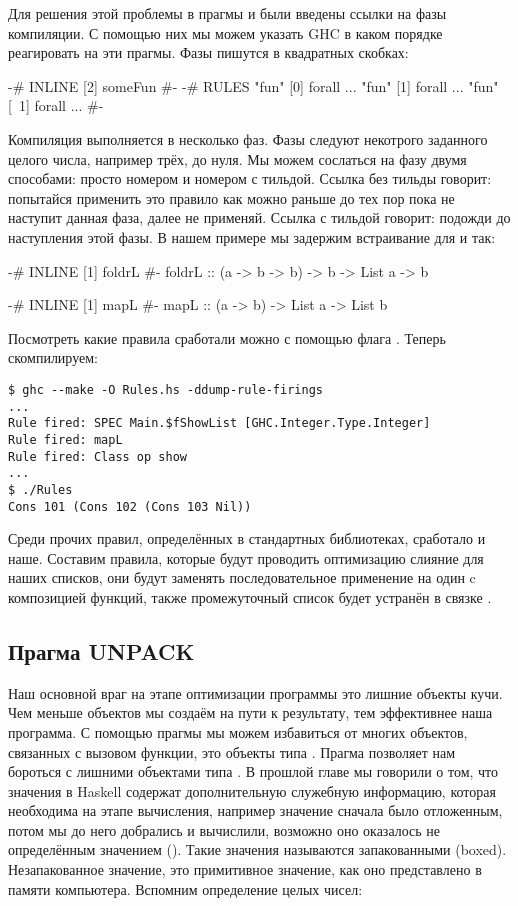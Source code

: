 Для решения этой проблемы в прагмы  и  были введены
ссылки на фазы компиляции. С помощью них мы можем указать GHC в каком
порядке реагировать на эти прагмы. Фазы пишутся в квадратных скобках:


\begin{code}
{-# INLINE [2] someFun #-}
{-# RULES
"fun" [0] forall ... 
"fun" [1] forall ... 
"fun" [~1] forall ... 
  #-}
\end{code}

Компиляция выполняется в несколько фаз. Фазы следуют некотрого заданного
целого числа, например трёх, до нуля. Мы можем сослаться на фазу двумя
способами: просто номером и номером с тильдой. Ссылка без тильды
говорит: попытайся применить это правило как можно раньше до тех пор
пока не наступит данная фаза, далее не применяй. Ссылка с тильдой
говорит: подожди до наступления этой фазы. В нашем примере мы задержим
встраивание для  и  так:


\begin{code}
{-# INLINE [1] foldrL #-}
foldrL :: (a -> b -> b) -> b -> List a -> b

{-# INLINE [1] mapL #-}
mapL :: (a -> b) -> List a -> List b
\end{code}

Посмотреть какие правила сработали можно с помощью флага
. Теперь скомпилируем:


\begin{verbatim}
$ ghc --make -O Rules.hs -ddump-rule-firings
...
Rule fired: SPEC Main.$fShowList [GHC.Integer.Type.Integer]
Rule fired: mapL
Rule fired: Class op show
...
$ ./Rules 
Cons 101 (Cons 102 (Cons 103 Nil))
\end{verbatim}

Среди прочих правил, определённых в стандартных библиотеках, сработало и
наше. Составим правила, которые будут проводить оптимизацию слияние для
наших списков, они будут заменять последовательное применение 
на один  c композицией функций, также промежуточный список
будет устранён в связке .

\subsection{Прагма UNPACK}

Наш основной враг на этапе оптимизации программы это лишние объекты
кучи. Чем меньше объектов мы создаём на пути к результату, тем
эффективнее наша программа. С помощью прагмы  мы можем
избавиться от многих объектов, связанных с вызовом функции, это объекты
типа . Прагма  позволяет нам бороться с лишними
объектами типа . В прошлой главе мы говорили о том, что значения
в Haskell содержат дополнительную служебную информацию, которая
необходима на этапе вычисления, например значение сначала было
отложенным, потом мы до него добрались и вычислили, возможно оно
оказалось не определённым значением (). Такие значения
называются запакованными (boxed). Незапакованное значение, это
примитивное значение, как оно представлено в памяти компьютера. Вспомним
определение целых чисел:


